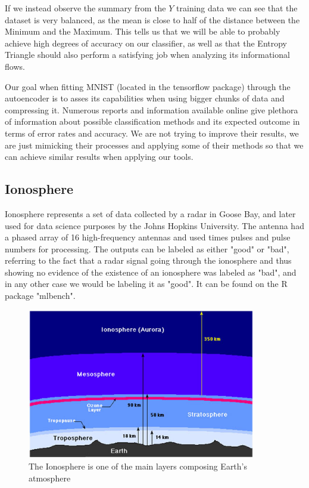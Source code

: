 If we instead observe the summary from the $Y$ training data we can see that the dataset is very balanced, as the mean is close to half of the distance between the Minimum and the Maximum. This tells us that we will be able to probably achieve high degrees of accuracy on our classifier, as well as that the Entropy Triangle should also perform a satisfying job when analyzing its informational flows.  \par

Our goal when fitting MNIST (located in the tensorflow package) through the autoencoder is to asses its capabilities when using bigger chunks of data and compressing it. Numerous reports and information available online give plethora of information about possible classification methods and its expected outcome in terms of error rates and accuracy. We are not trying to improve their results, we are just mimicking their processes and applying some of their methods so that we can achieve similar results when applying our tools.\par

\subsection{Ionosphere}

Ionosphere represents a set of data collected by a radar in Goose Bay, and later used for data science purposes by the Johns Hopkins University. The antenna had a phased array of 16 high-frequency antennas and used times pulses and pulse numbers for processing. The outputs can be labeled as either "good" or "bad", referring to the fact that a radar signal going through the ionosphere and thus showing no evidence of the existence of an ionosphere was labeled as "bad", and in any other case we would be labeling it as "good". It can be found on the R package "mlbench". \newline

\begin{figure}[H]
	\centering
	\includegraphics[width=10cm]{Figuras_tfg/Ionosphere}
	\caption{The Ionosphere is one of the main layers composing Earth's atmosphere}
	\label{fig:figure_pairs_iris}
\end{figure}

